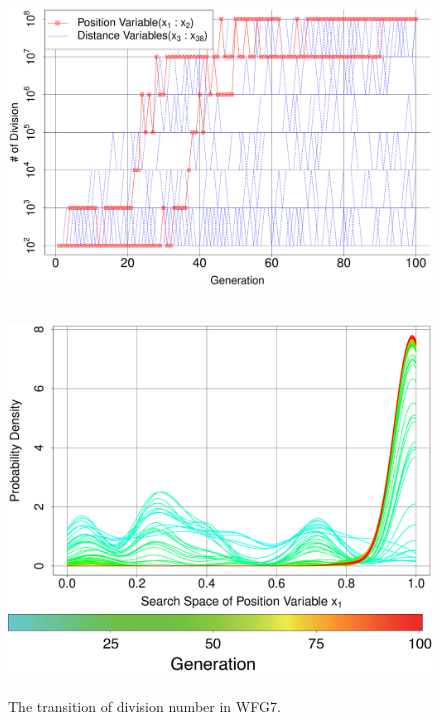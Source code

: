 \documentclass[../main/main]{subfiles}
\begin{document}
\begin{figure}[!h]
\begin{minipage}{0.38\hsize}
\vspace{-0.2in}
\includegraphics[width=1\linewidth]{../figures/multi_DTLZ4_digit_trend.eps}\\
\\
\caption{The transition of division number in WFG7.}
\label{digi_trans_multidtlz4}
\end{minipage}
\begin{minipage}{0.61\hsize}
\begin{minipage}{0.49\hsize}
\includegraphics[width=1\linewidth]{../figures/multi_DTLZ4_var1_pdf_trend.eps}\\
\centering
\hspace{0.2in} \includegraphics[width=0.8\linewidth]{../figures/color_bar_100ver.eps}

\end{minipage}
\end{minipage}
\end{figure}
\end{document}
